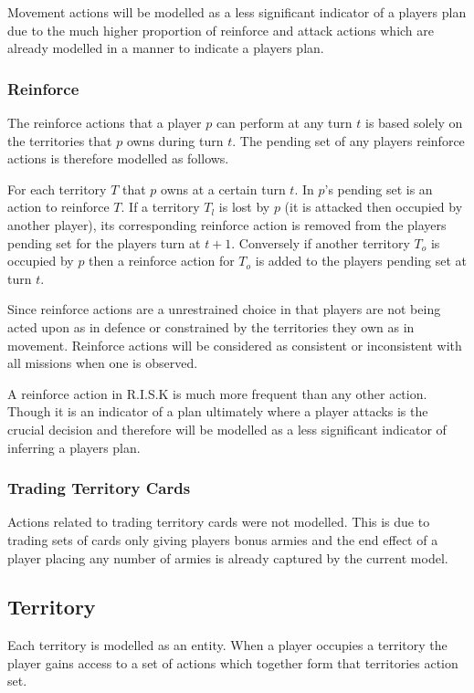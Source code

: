 \documentclass[parskip]{cs4rep}
\begin{document}
Movement actions will be modelled as a less significant indicator of a players plan due to the much higher proportion of reinforce and attack actions which are already modelled in a manner to indicate a players plan.

\subsubsection{Reinforce}

The reinforce actions that a player $p$ can perform at any turn $t$ is based solely on the territories that $p$ owns during turn $t$. The pending set of any players reinforce actions is therefore modelled as follows. 

For each territory $T$ that $p$ owns at a certain turn $t$. In $p$'s pending set is an action to reinforce $T$. If a territory $T_{l}$ is lost by $p$ (it is attacked then occupied by another player), its corresponding reinforce action is removed from the players pending set for the players turn at $t+1$. Conversely if another territory $T_{o}$ is occupied by $p$ then a reinforce action for $T_{o}$ is added to the players pending set at turn $t$.

Since reinforce actions are a unrestrained choice in that players are not being acted upon as in defence or constrained by the territories they own as in movement. Reinforce actions will be considered as consistent or inconsistent with all missions when one is observed.

A reinforce action in R.I.S.K is much more frequent than any other action. Though it is an indicator of a plan ultimately where a player attacks is the crucial decision and therefore will be modelled as a less significant indicator of inferring a players plan.

\subsubsection{Trading Territory Cards}

Actions related to trading territory cards were not modelled. This is due to trading sets of cards only giving players bonus armies and the end effect of a player placing any number of armies is already captured by the current model.

\subsection{Territory}

Each territory is modelled as an entity. When a player occupies a territory the player gains access to a set of actions which together form that territories action set.
\end{document}
